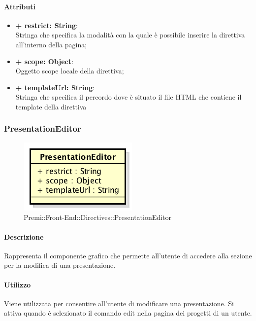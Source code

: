 	\paragraph{Attributi}
	\begin{itemize}
		\item \textbf{+ restrict: String}:\\
		Stringa che specifica la modalità con la quale è possibile inserire la direttiva all'interno della pagina;
		\item \textbf{+ scope: Object}:\\
		Oggetto scope locale della direttiva;
		\item \textbf{+ templateUrl: String}:\\
		Stringa che specifica il percordo dove è situato il file HTML che contiene il template della direttiva
	\end{itemize}
\newpage


\subsubsection{PresentationEditor}
	\begin{figure}[h]
		\centering
		\includegraphics[width=0.5\linewidth]{img/premi_front_end_directives_presentationeditor}
		\caption[Premi::Front-End::Directives::PresentationEditor]{Premi::Front-End::Directives::PresentationEditor}
	\end{figure}
	
	\paragraph{Descrizione}
	Rappresenta il componente grafico che permette all'utente di accedere alla sezione per la modifica di una presentazione.
	
	\paragraph{Utilizzo}
	Viene utilizzata per consentire all'utente di modificare una presentazione. Si attiva quando è selezionato il comando edit nella pagina dei progetti di un utente.
	
